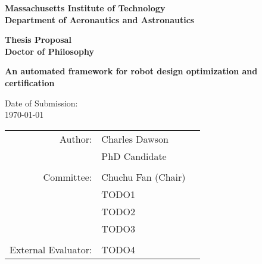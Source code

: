
\begin{center}
	{\LARGE\bf Massachusetts Institute of Technology \\
	\vspace{0.25\baselineskip}
	Department of Aeronautics and Astronautics}
	\vspace{\baselineskip}

	{\Large\bf Thesis Proposal \\
	\vspace{0.25\baselineskip}
	Doctor of Philosophy}
	\vspace{4\baselineskip}

	\vspace{2\baselineskip}
	{\LARGE\bf An automated framework for robot design optimization and certification}
	\vspace{3\baselineskip}

	Date of Submission: \\
	\vspace{0.5\baselineskip}
	\today

	\vspace{8\baselineskip}

	\begin{tabular}{rlc}
		{\small \sc Author:}
	        	                    & Charles Dawson  & \\
	        	                    & PhD Candidate & \\
		\\ %
		{\small \sc Committee:}
	        	                    & Chuchu Fan (Chair)  & \\
	            	                & TODO1 & \\
	            	                & TODO2 & \\
	            	                & TODO3 & \\
		\\ %
		{\small \sc External Evaluator:}
	            	                & TODO4 & \\
	\end{tabular}
\end{center}

